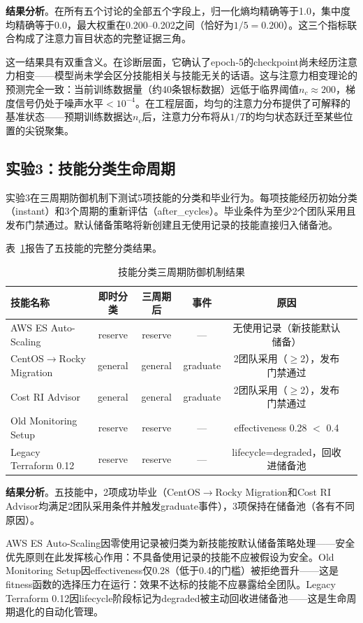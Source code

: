 \documentclass[12pt,a4paper]{ctexart}
\begin{document}
\textbf{结果分析}。在所有五个讨论的全部五个字段上，归一化熵均精确等于1.0，集中度均精确等于0.0，最大权重在0.200--0.202之间（恰好为$1/5 = 0.200$）。这三个指标联合构成了注意力盲目状态的完整证据三角。

这一结果具有双重含义。在诊断层面，它确认了epoch-5的checkpoint尚未经历注意力相变——模型尚未学会区分技能相关与技能无关的话语。这与注意力相变理论的预测完全一致：当前训练数据量（约40条银标数据）远低于临界阈值$n_c \approx 200$，梯度信号仍处于噪声水平$< 10^{-4}$。在工程层面，均匀的注意力分布提供了可解释的基准状态——预期训练数据达$n_c$后，注意力分布将从$1/T$的均匀状态跃迁至某些位置的尖锐聚集。

\subsection{实验3：技能分类生命周期}

实验3在三周期防御机制下测试5项技能的分类和毕业行为。每项技能经历初始分类（instant）和3个周期的重新评估（after\_cycles）。毕业条件为至少2个团队采用且发布门禁通过。默认储备策略将新创建且无使用记录的技能直接归入储备池。

表~\ref{tab:classification}报告了五技能的完整分类结果。

\begin{table}[H]
\centering
\caption{技能分类三周期防御机制结果}
\label{tab:classification}
\renewcommand{\arraystretch}{1.15}
\begin{tabular}{lccccl}
\toprule
技能名称 & 即时分类 & 三周期后 & 事件 & 原因 \\
\midrule
AWS ES Auto-Scaling & reserve & reserve & — & 无使用记录（新技能默认储备）\\
CentOS$\to$Rocky Migration & general & general & graduate & 2团队采用（$\geq$2），发布门禁通过\\
Cost RI Advisor & general & general & graduate & 2团队采用（$\geq$2），发布门禁通过\\
Old Monitoring Setup & reserve & reserve & — & effectiveness 0.28 $<$ 0.4\\
Legacy Terraform 0.12 & reserve & reserve & — & lifecycle=degraded，回收进储备池\\
\bottomrule
\end{tabular}
\end{table}

\textbf{结果分析}。五技能中，2项成功毕业（CentOS$\to$Rocky Migration和Cost RI Advisor均满足2团队采用条件并触发graduate事件），3项保持在储备池（各有不同原因）。

AWS ES Auto-Scaling因零使用记录被归类为新技能按默认储备策略处理——安全优先原则在此发挥核心作用：不具备使用记录的技能不应被假设为安全。Old Monitoring Setup因effectiveness仅0.28（低于0.4的门槛）被拒绝晋升——这是fitness函数的选择压力在运行：效果不达标的技能不应暴露给全团队。Legacy Terraform 0.12因lifecycle阶段标记为degraded被主动回收进储备池——这是生命周期退化的自动化管理。
\end{document}
